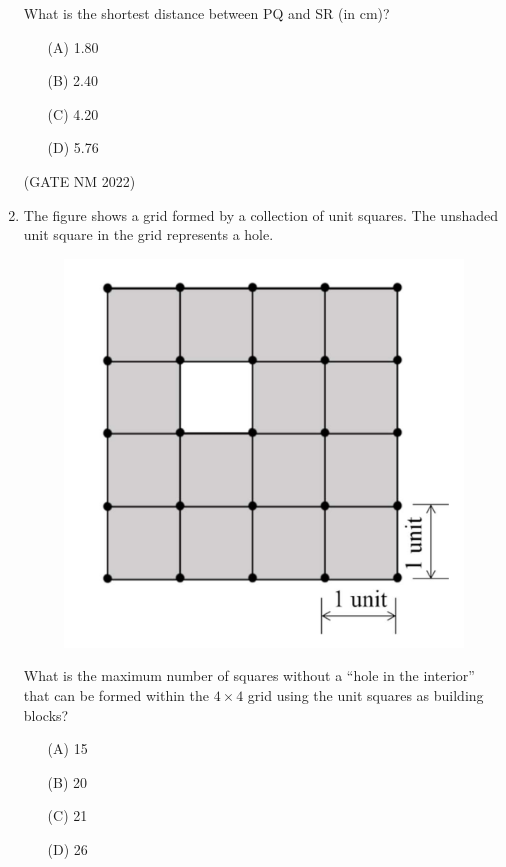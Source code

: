 \documentclass[journal,12pt,onecolumn]{IEEEtran}
\theoremstyle{remark}
\begin{document}
\begin{enumerate}
What is the shortest distance between PQ and SR (in cm)?\\[8pt]

\begin{enumerate}

	\item[(A)] 1.80 \\
	\item[(B)] 2.40 \\
	\item[(C)] 4.20 \\
	\item[(D)] 5.76 \\

\end{enumerate}

\hfill(GATE NM 2022)





\item  The figure shows a grid formed by a collection of unit squares. The unshaded unit square in the grid represents a hole.  

	\begin{figure}[h]
		\centering
	\includegraphics[width=0.5\columnwidth]{fig1}
	\caption{}
	\label{fig:placeholder}
	\end{figure}


What is the maximum number of squares without a ``hole in the interior'' that can be formed within the $4 \times 4$ grid using the unit squares as building blocks?  

\medskip
  
\begin{enumerate}
	\item [(A)] 15
	\item [(B)] 20
	\item [(C)] 21
	\item [(D)] 26
\end{enumerate}



\end{enumerate}
\end{document}
